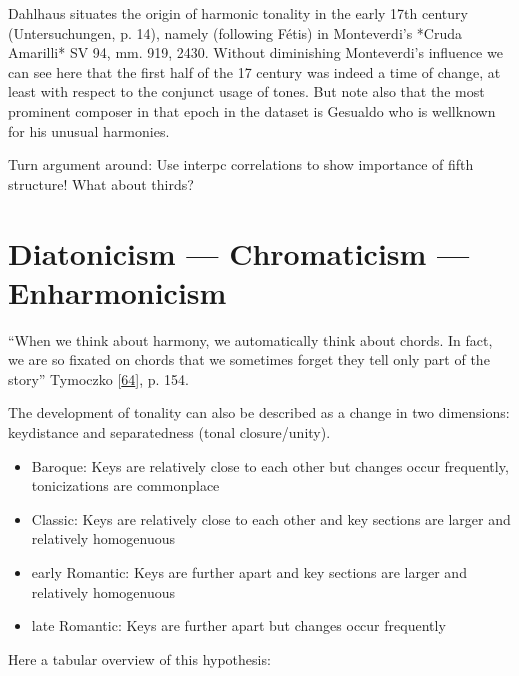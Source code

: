\documentclass[letterpaper,10pt,english]{sphinxmanual}
\begin{document}
\sphinxAtStartPar
Dahlhaus situates the origin of harmonic tonality in the early 17th
century (Untersuchungen, p. 14), namely (following Fétis) in
Monteverdi’s *Cruda Amarilli* SV 94, mm. 9\sphinxhyphen{}19, 24\sphinxhyphen{}30. Without
diminishing Monteverdi’s influence we can see here that the first half
of the 17 century was indeed a time of change, at least with respect to
the conjunct usage of tones. But note also that the most prominent
composer in that epoch in the dataset is Gesualdo who is well\sphinxhyphen{}known for
his unusual harmonies.

\sphinxAtStartPar
Turn argument around: Use inter\sphinxhyphen{}pc correlations to show importance of
fifth structure! What about thirds?


\chapter{Diatonicism — Chromaticism — Enharmonicism}
\label{\detokenize{diatonicism_chromaticism:diatonicism-chromaticism-enharmonicism}}\label{\detokenize{diatonicism_chromaticism::doc}}
\sphinxAtStartPar
“When we think about harmony, we automatically think about chords. In
fact, we are so fixated on chords that we sometimes forget they tell
only part of the story” Tymoczko {[}\hyperlink{cite.8_bibliography:id61}{64}{]}, p. 154.

\sphinxAtStartPar
The development of tonality can also be described as a change in two
dimensions: key\sphinxhyphen{}distance and separatedness (tonal closure/unity).
\begin{itemize}
\item {} 
\sphinxAtStartPar
Baroque: Keys are relatively close to each other but changes occur
frequently, tonicizations are commonplace

\item {} 
\sphinxAtStartPar
Classic: Keys are relatively close to each other and key sections are
larger and relatively homogenuous

\item {} 
\sphinxAtStartPar
early Romantic: Keys are further apart and key sections are larger
and relatively homogenuous

\item {} 
\sphinxAtStartPar
late Romantic: Keys are further apart but changes occur frequently

\end{itemize}

\sphinxAtStartPar
Here a tabular overview of this hypothesis:
\end{document}
